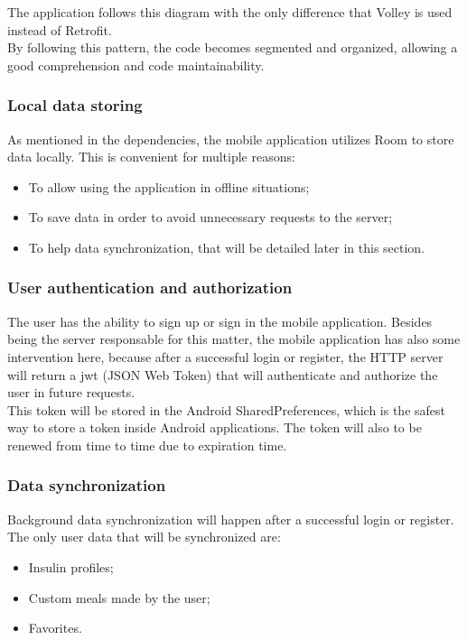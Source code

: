 The application follows this diagram with the only difference that Volley is used instead of Retrofit.\\

By following this pattern, the code becomes segmented and organized,
allowing a good comprehension and code maintainability.\\

\subsubsection{Local data storing}

As mentioned in the dependencies, the mobile application utilizes Room to store data locally. This is convenient
for multiple reasons: 
\begin{itemize}
    \item To allow using the application in offline situations;
    \item To save data in order to avoid unnecessary requests to the server;
    \item To help data synchronization, that will be detailed later in this section.
\end{itemize}

\subsubsection{User authentication and authorization}

The user has the ability to sign up or sign in the mobile application. Besides being the server responsable for this matter, the mobile application has also some intervention
here, because after a successful login or register, the HTTP server will return a jwt (JSON Web Token) that will authenticate and authorize the user in future requests.\\

This token will be stored in the Android SharedPreferences, which is the safest way to store a token inside Android applications. The token will also to be renewed from time
to time due to expiration time.

\subsubsection{Data synchronization}

Background data synchronization will happen after a successful login or register. The only user data that will be synchronized are:
\begin{itemize}
    \item Insulin profiles;
    \item Custom meals made by the user;
    \item Favorites.
\end{itemize}

